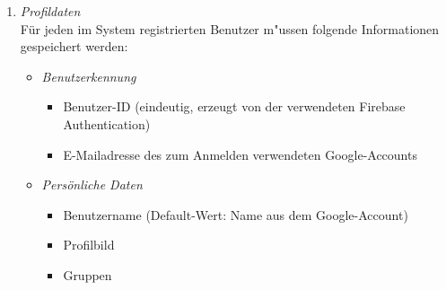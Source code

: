 \documentclass[parskip=full]{scrartcl}
\def\threedigits#1{%
  \ifnum#1<100 0\fi
  \ifnum#1<10 0\fi
  \number#1}
\begin{document}
\begin{enumerate}[label={\textbf{/D\protect\threedigits{\theenumi}0/}}, leftmargin=*]
	\item \textit{Profildaten} \label{Profildaten} \\Für jeden im System registrierten Benutzer m"ussen folgende Informationen gespeichert werden:
		\begin{itemize}
			\item \textit{Benutzerkennung}
				\begin{itemize}
					\item Benutzer-ID (eindeutig, erzeugt von der verwendeten Firebase Authentication)
					\item E-Mailadresse des zum Anmelden verwendeten Google-Accounts
				\end{itemize}
			\item \textit{Persönliche Daten} \label{persönliche Daten} 
			\begin{itemize}
			\item \gls{Benutzername} (Default-Wert: Name aus dem Google-Account)
			\item \colorbox{shadecolor}{Profilbild}
			\item Gruppen
		\end{itemize}
		\end{itemize}
	

\end{enumerate}
\end{document}
